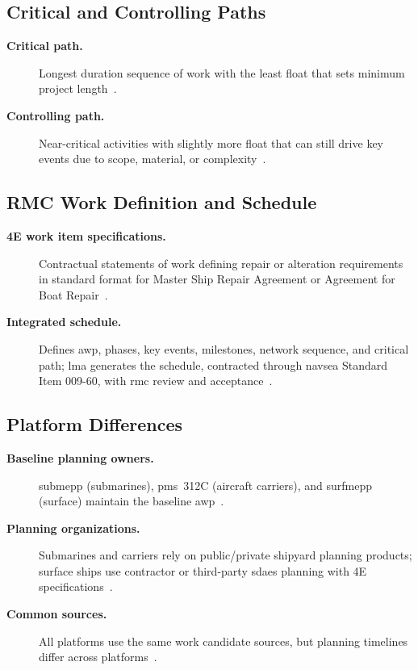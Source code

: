 \documentclass[../main.tex]{subfiles}
\begin{document}
\subsection{Critical and Controlling Paths}
\begin{description}
  \item[\textbf{Critical path.}] Longest duration sequence of work with the least float that sets minimum project length~\autocite{edo-4-2-1-cno-availability-planning-2025}.
  \item[\textbf{Controlling path.}] Near-critical activities with slightly more float that can still drive key events due to scope, material, or complexity~\autocite{edo-4-2-1-cno-availability-planning-2025}.
\end{description}

\subsection{RMC Work Definition and Schedule}
\begin{description}
  \item[\textbf{4E work item specifications.}] Contractual statements of work defining repair or alteration requirements in standard format for Master Ship Repair Agreement or Agreement for Boat Repair~\autocite{edo-4-2-1-cno-availability-planning-2025}.
  \item[\textbf{Integrated schedule.}] Defines \ac{awp}, phases, key events, milestones, network sequence, and critical path; \ac{lma} generates the schedule, contracted through \ac{navsea} Standard Item 009-60, with \ac{rmc} review and acceptance~\autocite{edo-4-2-1-cno-availability-planning-2025}.
\end{description}

\subsection{Platform Differences}
\begin{description}
  \item[\textbf{Baseline planning owners.}] \ac{submepp} (submarines), \ac{pms}~312C (aircraft carriers), and \ac{surfmepp} (surface) maintain the baseline \ac{awp}~\autocite{COMFLTFORCOMINST4790-3,edo-4-2-1-cno-availability-planning-2025}.
  \item[\textbf{Planning organizations.}] Submarines and carriers rely on public/private shipyard planning products; surface ships use contractor or third-party \ac{sdaes} planning with 4E specifications~\autocite{edo-4-2-1-cno-availability-planning-2025}.
  \item[\textbf{Common sources.}] All platforms use the same work candidate sources, but planning timelines differ across platforms~\autocite{edo-4-2-1-cno-availability-planning-2025}.
\end{description}
\end{document}
